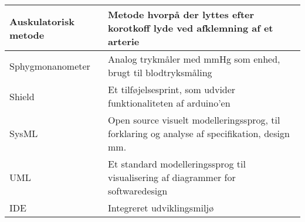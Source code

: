 \begin{longtable}{ |p{} |p{}| }
		\hline
		Auskulatorisk metode & Metode hvorpå der lyttes efter korotkoff lyde ved afklemning af et arterie \\
		\hline
		Sphygmonanometer & Analog trykmåler med mmHg som enhed, brugt til blodtryksmåling  \\
		\hline
		Shield & Et tilføjelsesprint, som udvider funktionaliteten af arduino'en \\
		\hline
		SysML & Open source visuelt modelleringssprog, til forklaring og analyse af specifikation, design mm.  \\
		\hline
		UML & Et standard modelleringssprog til visualisering af diagrammer for softwaredesign \\
		\hline
		IDE & Integreret udviklingsmiljø \\
		\hline
		
		
	\end{longtable}
\newpage